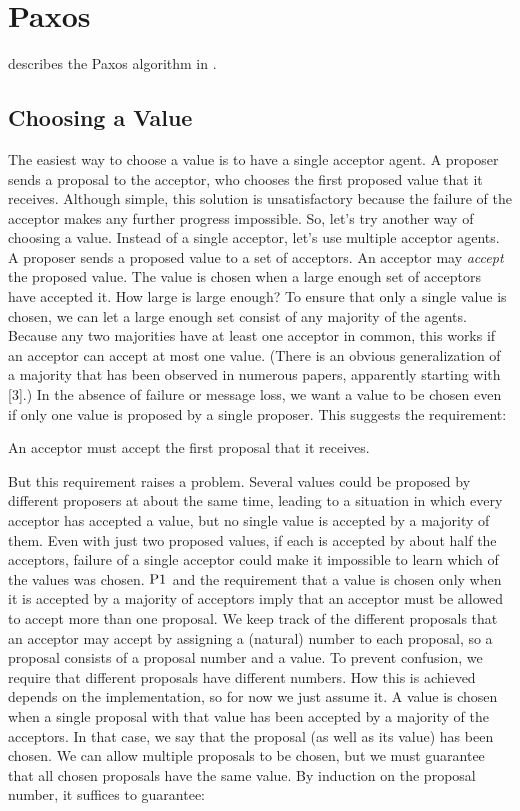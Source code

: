 \section{Paxos}
\citeauthor{Lamport01} describes the Paxos algorithm in \cite{Lamport01}.

\subsection{Choosing a Value}
The easiest way to choose a value is to have a single acceptor agent.
A proposer sends a proposal to the acceptor, who chooses the first proposed value
that it receives.
Although simple, this solution is unsatisfactory because the
failure of the acceptor makes any further progress impossible.
So, let's try another way of choosing a value.
Instead of a single acceptor, let's use multiple acceptor agents.
A proposer sends a proposed value to a set of acceptors.
An acceptor may \emph{accept} the proposed value.
The value is chosen when a large enough set of acceptors have accepted it.
How large is large enough?
To ensure that only a single value is chosen, we can let a large enough set consist of any majority of the agents.
Because any two majorities have at least one acceptor in common, this works if an acceptor can accept at most one value.
(There is an obvious generalization of a majority that has been observed in numerous papers, apparently starting with [3].)
In the absence of failure or message loss, we want a value to be chosen even if only one value is proposed by a single proposer.
This suggests the requirement:

\begin{paxostheoremenv}[$\PaxosTheorem{1}$]
    An acceptor must accept the first proposal that it receives.
\end{paxostheoremenv}

But this requirement raises a problem.
Several values could be proposed by different proposers at about the same time, leading to a situation in which every acceptor has accepted a value, but no single value is accepted by a majority of them.
Even with just two proposed values, if each is accepted by about half the acceptors, failure of a single acceptor could make it impossible to learn which of the values was chosen.
$\PaxosTheorem{1}$ and the requirement that a value is chosen only when it is accepted by a majority of acceptors imply that an acceptor must be allowed to accept more than one proposal.
We keep track of the different proposals that an acceptor may accept by assigning a (natural) number to each proposal, so a proposal consists of a proposal number and a value.
To prevent confusion, we require that different proposals have different numbers.
How this is achieved depends on the implementation, so for now we just assume it.
A value is chosen when a single proposal with that value has been accepted by a majority of the acceptors.
In that case, we say that the proposal (as well as its value) has been chosen.
We can allow multiple proposals to be chosen, but we must guarantee that all chosen proposals have the same value.
By induction on the proposal number, it suffices to guarantee:

